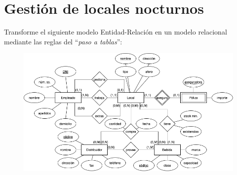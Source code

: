 \documentclass{db-practice}
\begin{document}
\section{Gestión de locales nocturnos}

Transforme el siguiente modelo Entidad-Relación en un modelo relacional mediante las reglas del ``\textit{paso a tablas}'':

\begin{figure}[H]
    \centering
    \includegraphics[width=\textwidth]{figs/gestion-locales-nocturnos}
\end{figure}
\end{document}
